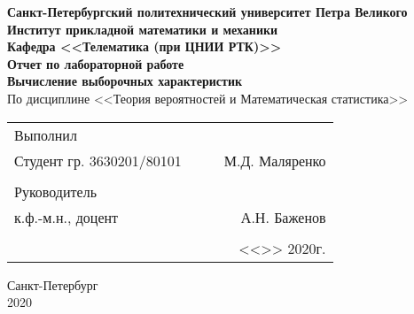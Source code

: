 \documentclass[12pt]{article}
\begin{document}
\begin{titlepage}
	\begin{center}
		\hfill \break
		{\textbf{Санкт-Петербургский политехнический университет Петра Великого}}\\
		\hfill \break
		\textbf{Институт прикладной математики и механики}\\
		 \hfill \break
		\textbf{Кафедра <<Телематика (при ЦНИИ РТК)>>}\\
		\vfill
		\large{\bfseries Отчет по лабораторной работе}\\
		\hfill \break
		\hfill \break
		\hfill \break
		\hfill \break
		\normalsize{\bfseries Вычисление выборочных характеристик}\\
		По дисциплине <<Теория вероятностей и Математическая статистика>>\\
		\hfill \break
		\hfill \break
		\hfill \break
	\end{center}
 
	\normalsize
	{ 
		\begin{tabular}{lp{2cm}cr}
			Выполнил &&&\\
			Студент гр. 3630201/80101&&\underline{\hspace{1.5cm}}& М.Д. Маляренко\\\\
			Руководитель&&&\\ 
			к.ф.-м.н., доцент && \underline{\hspace{1.5cm}}& А.Н. Баженов \\\\
			&&&<<\underline{\phantom{333}}>>\underline{\phantom{сентября000}}
			2020г.
		\end{tabular}
	}
\vfill

\begin{center} Санкт-Петербург \\2020 \end{center}
\end{titlepage}

\newpage

\setcounter{page}{2}
\end{document}

